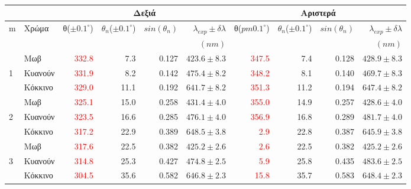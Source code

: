 \documentclass[a4paper]{article}
\begin{document}
\begin{table}[h]
\centering
\small
\caption{ }
\begin{tabular}{l|l|r|r|r|r|r|r|r|r}
\toprule
\multicolumn{2}{c|}{} & \multicolumn{4}{c|}{Δεξιά} &  \multicolumn{4}{c}{Αριστερά} \\
	 \hline
m & Χρώμα &  θ($\pm0.1^{\circ}$)&  $\theta_n$($\pm0.1^{\circ}$) &  $sin(\theta_n)$ &  $\lambda_{exp}\pm\delta\lambda$ &  θ($pm0.1^{\circ}$)&  $\theta_n$($\pm0.1^{\circ}$) & $sin(\theta_n)$ &  $\lambda_{exp}\pm\delta\lambda$\\ 
 & & & & & $(nm)$ & & & & $(nm)$ \\ 
\hline \hline
& Μωβ 		&  \textcolor{red}{332.8} &         7.3 &        0.127 &    $423.6\pm 8.3$ & \textcolor{red}{347.5} &     7.4 &    0.128 &   $428.9\pm8.3$ \\
1& Κυανούν &  \textcolor{red}{331.9} &         8.2 &        0.142 &    $475.4\pm8.2$ & \textcolor{red}{348.2} &    8.1 &    0.140 &     $469.7\pm8.3$ \\
& Κόκκινο &  \textcolor{red}{329.0} &        11.1 &        0.192 &    $641.7\pm8.2$ & \textcolor{red}{351.3} &  11.2 &       0.194 &    $647.4\pm8.2$ \\   
\hline 
& Μωβ 		&  \textcolor{red}{325.1} &        15.0 &        0.258 &    $431.4\pm4.0$ & \textcolor{red}{355.0} & 14.9 &       0.257 &   $428.6\pm4.0$ \\
2& Κυανούν &  \textcolor{red}{323.5} &        16.6 &        0.285 &    $476.1\pm4.0$ & \textcolor{red}{356.9} & 16.8 &       0.289 &    $481.7\pm4.0$ \\
& Κόκκινο &  \textcolor{red}{317.2} &        22.9 &        0.389 &    $648.5\pm3.8$ &   \textcolor{red}{2.9} & 22.8 &       0.387 &     $645.9\pm3.8$ \\   
\hline
& Μωβ 		&  \textcolor{red}{317.6} &        22.5 &        0.382 &    $425.2\pm2.6$ &   \textcolor{red}{2.6} &  22.5 &      0.382 &   $425.2\pm2.6$ \\
3& Κυανούν &  \textcolor{red}{314.8} &        25.3 &        0.427 &    $474.8\pm2.5$ &   \textcolor{red}{5.9} &   25.8 &       0.435 &  $483.6\pm2.5$ \\
& Κόκκινο &  \textcolor{red}{304.5} &        35.6 &        0.582 &    $646.8\pm2.3$&  \textcolor{red}{15.8} &    35.7 &       0.583 &   $648.4\pm2.3$ \\
\bottomrule
\end{tabular}
\end{table}
\end{document}

